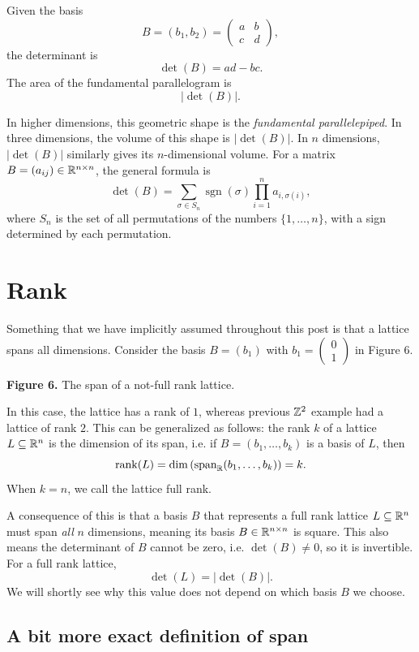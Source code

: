 \documentclass{article}
\begin{document}
Given the basis
\[
B = 
(b_1, b_2)
=
\begin{pmatrix}
a & b\\
c & d
\end{pmatrix},
\]
the determinant is
\[
\det(B) = ad - bc.
\]
The area of the fundamental parallelogram is
\[
\lvert \det(B) \rvert.
\]

In higher dimensions, this geometric shape is the \emph{fundamental parallelepiped}.
In three dimensions, the volume of this shape is
$\lvert\det(B)\rvert$.
In $n$ dimensions, $\lvert\det(B)\rvert$ similarly gives its
$n$-dimensional volume.
For a matrix $B=(a_{ij})\in\mathbb{R}^{n\times n}$, the general formula is
\[
\det(B)
=
\sum_{\sigma\in S_n}
\operatorname{sgn}(\sigma)
\prod_{i=1}^{n} a_{i,\sigma(i)},
\]
where $S_n$ is the set of all permutations of the numbers $\{1,\ldots,n\}$, with a sign determined by each permutation.



\section{Rank}
Something that we have implicitly assumed throughout this post is that a lattice spans all dimensions.
Consider the basis $B=(b_1)$ with
$b_1=\left(\begin{smallmatrix}0\\1\end{smallmatrix}\right)$
in Figure 6.

{\textbf{Figure 6.} The span of a not-full rank lattice.}

In this case, the lattice has a rank of $1$, whereas previous $\mathbb{Z}^2$ example had a lattice of rank $2$.
This can be generalized as follows: the rank $k$ of a lattice $L \subseteq \mathbb{R}^n$ is the dimension of its span, i.e. if $B=(b_1,\ldots,b_k)$ is a basis of $L$, then
\[
\operatorname{rank}(L)
=
\dim\left(\operatorname{span}_{\mathbb{R}}(b_1,\ldots,b_k)\right)
=
k.
\]
When $k = n$, we call the lattice full rank.


A consequence of this is that a basis $B$ that represents a full rank lattice $L \subseteq \mathbb{R}^n$ must span \emph{all} $n$ dimensions, meaning its basis $B \in \mathbb{R}^{n\times n}$ is square.
This also means the determinant of $B$ cannot be zero, i.e. $\det(B) \neq 0$, so it is invertible.
For a full rank lattice, 
\[
\det(L)=\lvert\det(B)\rvert.
\]
We will shortly see why this value does not depend on which basis $B$ we choose.

\subsection{A bit more exact definition of span}
\end{document}
